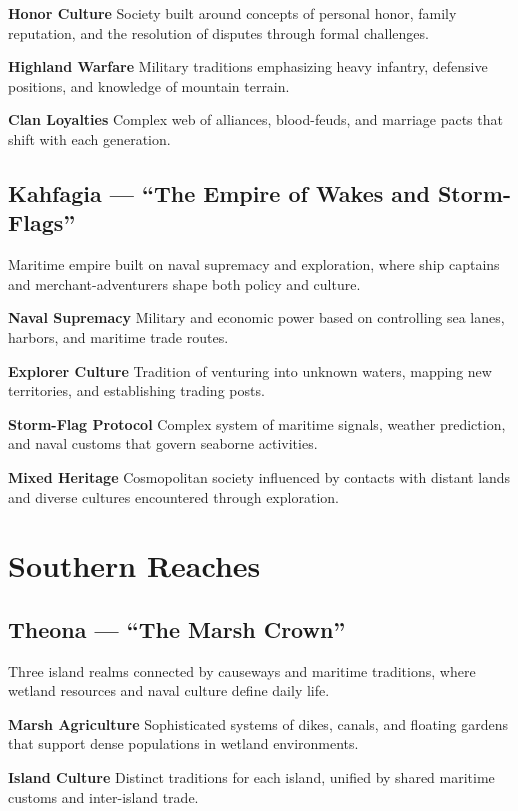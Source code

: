 \documentclass[11pt,twoside,openany]{book}
\begin{document}
\textbf{Honor Culture} Society built around concepts of personal honor, family reputation, and the resolution of disputes through formal challenges.

\textbf{Highland Warfare} Military traditions emphasizing heavy infantry, defensive positions, and knowledge of mountain terrain.

\textbf{Clan Loyalties} Complex web of alliances, blood-feuds, and marriage pacts that shift with each generation.

\subsection*{Kahfagia --- ``The Empire of Wakes and Storm-Flags''}

Maritime empire built on naval supremacy and exploration, where ship captains and merchant-adventurers shape both policy and culture.

\textbf{Naval Supremacy} Military and economic power based on controlling sea lanes, harbors, and maritime trade routes.

\textbf{Explorer Culture} Tradition of venturing into unknown waters, mapping new territories, and establishing trading posts.

\textbf{Storm-Flag Protocol} Complex system of maritime signals, weather prediction, and naval customs that govern seaborne activities.

\textbf{Mixed Heritage} Cosmopolitan society influenced by contacts with distant lands and diverse cultures encountered through exploration.

\section*{Southern Reaches} 

\subsection*{Theona --- ``The Marsh Crown''}

Three island realms connected by causeways and maritime traditions, where wetland resources and naval culture define daily life.

\textbf{Marsh Agriculture} Sophisticated systems of dikes, canals, and floating gardens that support dense populations in wetland environments.

\textbf{Island Culture} Distinct traditions for each island, unified by shared maritime customs and inter-island trade.
\end{document}

